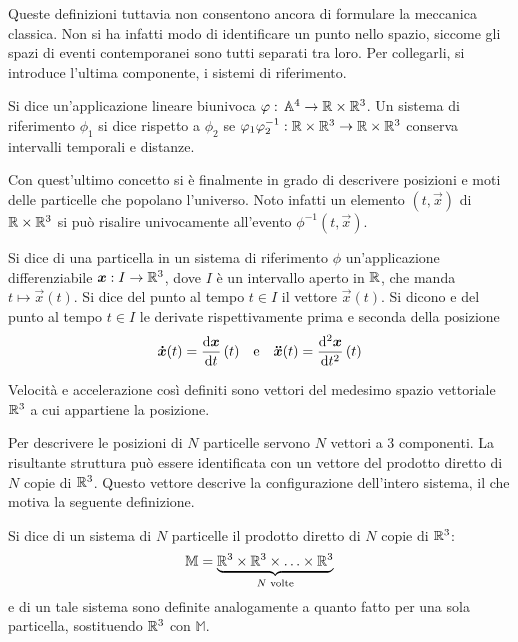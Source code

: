 Queste definizioni tuttavia non consentono ancora di formulare la meccanica classica. Non si ha infatti modo di identificare un punto nello spazio, siccome gli spazi di eventi contemporanei sono tutti separati tra loro. Per collegarli, si introduce l'ultima componente, i sistemi di riferimento.
\begin{definition}
  Si dice  un'applicazione lineare biunivoca $\varphi:\, \mathbb{A}^4 \to \mathbb{R}\times \mathbb{R}^3$. Un sistema di riferimento $\phi_1$ si dice  rispetto a $\phi_2$ se $\varphi_1 \varphi_2^{-1}: \mathbb{R}\times \mathbb{R}^3\to \mathbb{R}\times \mathbb{R}^3$ conserva intervalli temporali e distanze.
\end{definition}

Con quest'ultimo concetto si è finalmente in grado di descrivere posizioni e moti delle particelle che popolano l'universo. Noto infatti un elemento $(t,\vec{x})$ di $\mathbb{R} \times  \mathbb{R}^3$ si può risalire univocamente all'evento $\phi^{-1}(t,\vec{x})$.
\begin{definition}
  Si dice  di una particella in un sistema di riferimento $\phi$ un'applicazione differenziabile $\boldsymbol{x}:I \to \mathbb{R}^3$, dove $I$ è un intervallo aperto in $\mathbb{R}$, che manda $t\mapsto \vec{x}(t)$. Si dice  del punto al tempo $t \in I$ il vettore $\vec{x}(t)$. Si dicono  e  del punto al tempo $t \in I$ le derivate rispettivamente prima e seconda della posizione \begin{equation*}
  \vec{\dot{x}} (t) = \dv{\vec{x}}{t}\, (t) \qqtext{e} \vec{\ddot{x}} (t) = \dv[2]{\vec{x}}{t}\, (t)
  \end{equation*} 
\end{definition}
\begin{remark}
  Velocità e accelerazione così definiti sono vettori del medesimo spazio vettoriale $\mathbb{R}^3$ a cui appartiene la posizione.
\end{remark}

Per descrivere le posizioni di $N$ particelle servono $N$ vettori a 3 componenti. La risultante struttura può essere identificata con un vettore del prodotto diretto di $N$ copie di $\mathbb{R}^3$. Questo vettore descrive la configurazione dell'intero sistema, il che motiva la seguente definizione.
\begin{definition} \label{def:configSpace}
  Si dice  di un sistema di $N$ particelle il prodotto diretto di $N$ copie di $\mathbb{R}^3$: \begin{equation*}
  \mathbb{M} = \underbrace{\mathbb{R}^3 \times \mathbb{R}^3 \times \ldots \times \mathbb{R}^3}_{N \text{ volte}}
  \end{equation*} 
   e  di un tale sistema sono definite analogamente a quanto fatto per una sola particella, sostituendo $\mathbb{R}^3$ con $\mathbb{M}$.
\end{definition}

